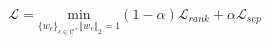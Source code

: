 \begin{equation}
\label{eq:prototype-objective}
\mathcal{L}=\underset{\{{w}_{c}{\}}_{c\in \mathcal{C}},{\left\Vert {w}_{c}\right\Vert }_{2}=1}{\mathrm{min}}(1-\alpha ){\mathcal{L}}_{rank}+\alpha {\mathcal{L}}_{sep}
\end{equation}
